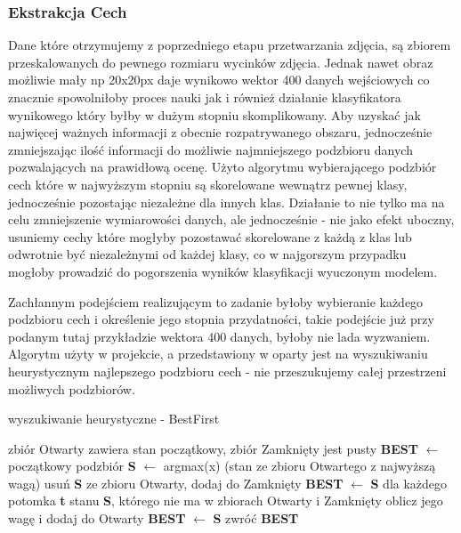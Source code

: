 \documentclass{classrep}
\begin{document}
\subsubsection{Ekstrakcja Cech} 
\label{cfseval}
Dane które otrzymujemy z poprzedniego etapu przetwarzania zdjęcia, są zbiorem przeskalowanych do pewnego rozmiaru wycinków zdjęcia. Jednak nawet obraz możliwie mały np 20x20px daje wynikowo wektor 400 danych wejściowych co znacznie spowolniłoby proces nauki jak i również działanie klasyfikatora wynikowego który byłby w dużym stopniu skomplikowany. Aby uzyskać jak najwięcej ważnych informacji z obecnie rozpatrywanego obszaru, jednocześnie  zmniejszając ilość informacji do możliwie najmniejszego podzbioru danych pozwalających na prawidłową ocenę. Użyto algorytmu wybierającego podzbiór cech które w najwyższym stopniu są skorelowane wewnątrz pewnej klasy, jednocześnie pozostając niezależne dla innych klas. Działanie to nie tylko ma na celu zmniejszenie wymiarowości danych, ale jednocześnie - nie jako efekt uboczny, usuniemy cechy które mogłyby pozostawać skorelowane z każdą z klas lub odwrotnie być niezależnymi od każdej klasy,  co w najgorszym przypadku mogłoby prowadzić do pogorszenia wyników klasyfikacji wyuczonym modelem.

Zachłannym podejściem realizującym to zadanie byłoby wybieranie każdego podzbioru cech i określenie jego stopnia przydatności, takie podejście już przy podanym tutaj przykładzie wektora 400 danych, byłoby nie lada wyzwaniem.\\ 
Algorytm użyty w projekcie, a przedstawiony w \cite{Hall1998} oparty jest na wyszukiwaniu heurystycznym najlepszego podzbioru cech - nie przeszukujemy całej przestrzeni możliwych podzbiorów. 
\begin{algorithm}
\caption{wyszukiwanie heurystyczne - BestFirst}
\label{bestfirst}
\begin{algorithmic}[1]
\STATE zbiór Otwarty zawiera stan początkowy, zbiór Zamknięty jest pusty
\STATE \textbf{BEST} $\leftarrow$ początkowy podzbiór
\STATE \textbf{S} $\leftarrow$ argmax(x) (stan ze zbioru Otwartego z najwyższą wagą)
\STATE usuń \textbf{S} ze zbioru Otwarty, dodaj do Zamknięty
\STATE \textbf{BEST} $\leftarrow$ \textbf{S}
\ENDIF
\STATE dla każdego potomka \textbf{t} stanu \textbf{S}, którego nie ma w zbiorach Otwarty i Zamknięty oblicz jego wagę i dodaj do Otwarty
\STATE \textbf{BEST} $\leftarrow$ \textbf{S}
\ELSE
\STATE zwróć \textbf{BEST}
\ENDIF
\end{algorithmic}
\end{algorithm}
\end{document}
